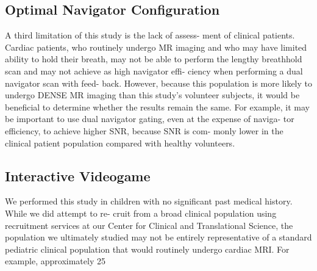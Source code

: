 	
\subsection{Optimal Navigator Configuration}
	A third limitation of this study is the lack of assess-
	ment of clinical patients. Cardiac patients, who routinely undergo MR imaging and who may have limited ability to hold their breath, may not be able to perform the lengthy breathhold scan and may not achieve as high navigator effi- ciency when performing a dual navigator scan with feed- back. However, because this population is more likely to undergo DENSE MR imaging than this study’s volunteer subjects, it would be beneficial to determine whether the results remain the same. For example, it may be important to use dual navigator gating, even at the expense of naviga- tor efficiency, to achieve higher SNR, because SNR is com- monly lower in the clinical patient population compared with healthy volunteers.
	
\subsection{Interactive Videogame}

	We performed this study in children with no significant past medical history. While we did attempt to re- cruit from a broad clinical population using recruitment services at our Center for Clinical and Translational Science, the population we ultimately studied may not be entirely representative of a standard pediatric clinical population that would routinely undergo cardiac MRI. For example, approximately 25 %
	
